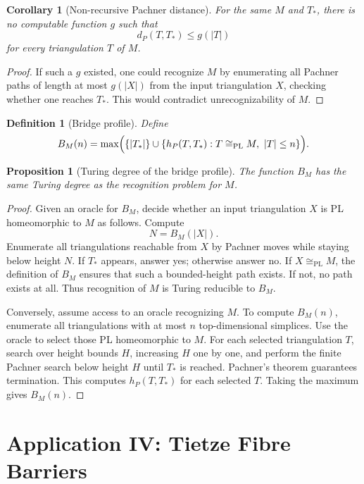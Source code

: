 \documentclass[11pt]{article}
\newtheorem{proposition}[theorem]{Proposition}
\newtheorem{corollary}[theorem]{Corollary}
\newtheorem{definition}[theorem]{Definition}
\begin{document}
\begin{corollary}[Non-recursive Pachner distance]
For the same \(M\) and \(T_\ast\), there is no computable function \(g\) such that
\[
d_P(T,T_\ast)\leq g(|T|)
\]
for every triangulation \(T\) of \(M\).
\end{corollary}

\begin{proof}
If such a \(g\) existed, one could recognize \(M\) by enumerating all Pachner paths of length at most \(g(|X|)\) from the input triangulation \(X\), checking whether one reaches \(T_\ast\). This would contradict unrecognizability of \(M\).
\end{proof}

\begin{definition}[Bridge profile]
Define
\[
B_M(n)
=
\max\Bigl(\{|T_\ast|\}\cup
\{h_P(T,T_\ast):T\cong_{\mathrm{PL}}M,\ |T|\leq n\}\Bigr).
\]
\end{definition}

\begin{proposition}[Turing degree of the bridge profile]
The function \(B_M\) has the same Turing degree as the recognition problem for \(M\).
\end{proposition}

\begin{proof}
Given an oracle for \(B_M\), decide whether an input triangulation \(X\) is PL homeomorphic to \(M\) as follows. Compute
\[
N=B_M(|X|).
\]
Enumerate all triangulations reachable from \(X\) by Pachner moves while staying below height \(N\). If \(T_\ast\) appears, answer yes; otherwise answer no. If \(X\cong_{\mathrm{PL}}M\), the definition of \(B_M\) ensures that such a bounded-height path exists. If not, no path exists at all. Thus recognition of \(M\) is Turing reducible to \(B_M\).

Conversely, assume access to an oracle recognizing \(M\). To compute \(B_M(n)\), enumerate all triangulations with at most \(n\) top-dimensional simplices. Use the oracle to select those PL homeomorphic to \(M\). For each selected triangulation \(T\), search over height bounds \(H\), increasing \(H\) one by one, and perform the finite Pachner search below height \(H\) until \(T_\ast\) is reached. Pachner's theorem guarantees termination. This computes \(h_P(T,T_\ast)\) for each selected \(T\). Taking the maximum gives \(B_M(n)\).
\end{proof}

\section{Application IV: Tietze Fibre Barriers}
\end{document}
